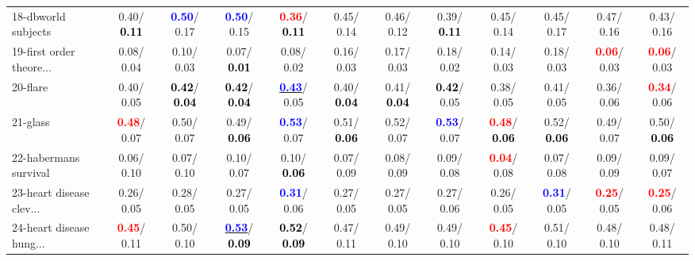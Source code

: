 \begin{table}[h]
\begin{center}
{\begin{tabular}{lc|c|c|c|c|c|c|c|c|c|c}
18-dbworld subjects &   0.40/\textcolor{black}{\textbf{  0.11}} & \textcolor{blue}{\textbf{  0.50}}/  0.17 & \textcolor{blue}{\textbf{  0.50}}/  0.15 & \textcolor{red}{\textbf{  0.36}}/\textcolor{black}{\textbf{  0.11}} &   0.45/  0.14 &   0.46/  0.12 &   0.39/\textcolor{black}{\textbf{  0.11}} &   0.45/  0.14 &   0.45/  0.17 &   0.47/  0.16 &   0.43/  0.16 \\
19-first order theore... &   0.08/  0.04 &   0.10/  0.03 &   0.07/\textcolor{black}{\textbf{  0.01}} &   0.08/  0.02 &   0.16/  0.03 &   0.17/  0.03 &   0.18/  0.02 &   0.14/  0.03 &   0.18/  0.03 & \textcolor{red}{\textbf{  0.06}}/  0.03 & \textcolor{red}{\textbf{  0.06}}/  0.03 \\
20-flare &   0.40/  0.05 & \textcolor{black}{\textbf{  0.42}}/\textcolor{black}{\textbf{  0.04}} & \textcolor{black}{\textbf{  0.42}}/\textcolor{black}{\textbf{  0.04}} & \underline{\textcolor{blue}{\textbf{  0.43}}}/  0.05 &   0.40/\textcolor{black}{\textbf{  0.04}} &   0.41/\textcolor{black}{\textbf{  0.04}} & \textcolor{black}{\textbf{  0.42}}/  0.05 &   0.38/  0.05 &   0.41/  0.05 &   0.36/  0.06 & \textcolor{red}{\textbf{  0.34}}/  0.06 \\
21-glass & \textcolor{red}{\textbf{  0.48}}/  0.07 &   0.50/  0.07 &   0.49/\textcolor{black}{\textbf{  0.06}} & \textcolor{blue}{\textbf{  0.53}}/  0.07 &   0.51/\textcolor{black}{\textbf{  0.06}} &   0.52/  0.07 & \textcolor{blue}{\textbf{  0.53}}/  0.07 & \textcolor{red}{\textbf{  0.48}}/\textcolor{black}{\textbf{  0.06}} &   0.52/\textcolor{black}{\textbf{  0.06}} &   0.49/  0.07 &   0.50/\textcolor{black}{\textbf{  0.06}} \\ \hline
22-habermans survival &   0.06/  0.10 &   0.07/  0.10 &   0.10/  0.07 &   0.10/\textcolor{black}{\textbf{  0.06}} &   0.07/  0.09 &   0.08/  0.09 &   0.09/  0.08 & \textcolor{red}{\textbf{  0.04}}/  0.08 &   0.07/  0.08 &   0.09/  0.09 &   0.09/  0.07 \\
23-heart disease clev... &   0.26/  0.05 &   0.28/  0.05 &   0.27/  0.05 & \textcolor{blue}{\textbf{  0.31}}/  0.06 &   0.27/  0.05 &   0.27/  0.05 &   0.27/  0.06 &   0.26/  0.05 & \textcolor{blue}{\textbf{  0.31}}/  0.05 & \textcolor{red}{\textbf{  0.25}}/  0.05 & \textcolor{red}{\textbf{  0.25}}/  0.06 \\
24-heart disease hung... & \textcolor{red}{\textbf{  0.45}}/  0.11 &   0.50/  0.10 & \underline{\textcolor{blue}{\textbf{  0.53}}}/\textcolor{black}{\textbf{  0.09}} & \textcolor{black}{\textbf{  0.52}}/\textcolor{black}{\textbf{  0.09}} &   0.47/  0.11 &   0.49/  0.10 &   0.49/  0.10 & \textcolor{red}{\textbf{  0.45}}/  0.10 &   0.51/  0.10 &   0.48/  0.10 &   0.48/  0.11 \\

\end{tabular}}
\end{center}
\end{table}
